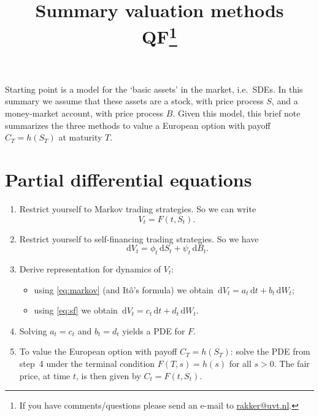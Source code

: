 \documentclass[11pt]{article}
\title{Summary valuation methods\\ QF\thanks{If you have comments/questions please send an e-mail to \href{mailto:rakker@uvt.nl}{rakker@uvt.nl}.}}
\author{}
\date{}
\newcommand{\rd}{\,\mathrm{d}}
\begin{document}
\maketitle

\noindent
Starting point is a model for the `basic assets' in the market, i.e.\ SDEs. In this summary we assume that these assets are a stock, with price process $S$, and a money-market account, with price process $B$. Given this model, this brief note summarizes the three methods to value a European option with payoff $C_T=h(S_T)$ at maturity $T$.

\section{Partial differential equations}
\begin{enumerate}
\item Restrict yourself to Markov trading strategies. So we can write
\begin{equation}\label{eq:markov}
V_t = F(t, S_t).
\end{equation}
\item Restrict yourself to self-financing trading strategies. So we have
\begin{equation}\label{eq:sf}
\rd V_t = \phi_t \rd S_t + \psi_t \rd B_t.
\end{equation}
\item Derive representation for dynamics of $V_t$:
\begin{itemize}
\item using \eqref{eq:markov} (and It\^o's formula) we obtain $\rd V_t = a_t \rd t + b_t \rd W_t$;
\item using \eqref{eq:sf} we obtain $\rd V_t = c_t \rd t + d_t \rd W_t$.
\end{itemize}
\item Solving $a_t=c_t$ and $b_t=d_t$ yields a PDE for $F$.
\item To value the European option with payoff $C_T=h(S_T)$: solve the PDE from step~4 under the terminal condition $F(T,s)=h(s)$ for all $s>0$. The fair price, at time $t$, is then given by $C_t=F(t,S_t)$.
\end{enumerate}
\end{document}
